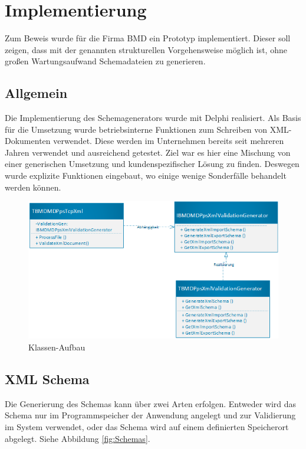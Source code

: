 \chapter{Implementierung}
\label{cha:Implementierung}
Zum Beweis wurde für die Firma BMD ein Prototyp implementiert. 
Dieser soll zeigen, dass mit der genannten strukturellen Vorgehensweise möglich ist, ohne großen Wartungsaufwand Schemadateien zu generieren.


\section{Allgemein}
Die Implementierung des Schemagenerators wurde mit Delphi realisiert. 
Als Basis für die Umsetzung wurde betriebsinterne Funktionen zum Schreiben von XML-Dokumenten verwendet. 
Diese werden im Unternehmen bereits seit mehreren Jahren verwendet und ausreichend getestet.
Ziel war es hier eine Mischung von einer generischen Umsetzung und kundenspezifischer Lösung zu finden. 
Deswegen wurde explizite Funktionen eingebaut, wo einige wenige Sonderfälle behandelt werden können.


\begin{figure}
    \centering
    \includegraphics[width=.95\textwidth]{images/KlassenUML.png}
    \caption{Klassen-Aufbau}
    \label{fig:Klassenaufbau}
\end{figure}

\section{XML Schema}
Die Generierung des Schemas kann über zwei Arten erfolgen. 
Entweder wird das Schema nur im Programmspeicher der Anwendung angelegt und zur Validierung im System verwendet, oder das Schema wird auf einem definierten Speicherort abgelegt. Siehe Abbildung \ref{fig:Schemas}.

